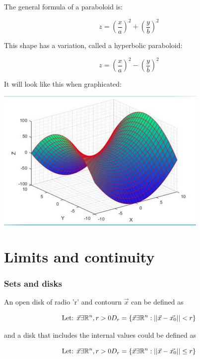 \documentclass[11pt,fleqn]{book} %
\begin{document}
The general formula of a paraboloid is:

\begin{equation}
    z = (\frac{x}{a})^2 + (\frac{y}{b})^2
\end{equation}

This shape has a variation, called a hyperbolic paraboloid:


\begin{equation}
    z = (\frac{x}{a})^2 - (\frac{y}{b})^2
\end{equation}

It will look like this when graphicated:
\begin{center}
    \includegraphics*[]{Pictures/hyperbolic_paraboloid.png}    
\end{center}

\chapter{Limits and continuity}
\subsection*{Sets and disks}
An open disk of radio 'r' and contourn $\vec{x}$ can be defined as


\begin{equation}
    \text{Let: }\vec{x}\exists\mathbb{R}^n , r > 0 \\ D_r = \{ \vec{x} \exists \mathbb{R}^n: ||\vec{x} - \vec{x_0} || < r \}
\end{equation}

and a disk that includes the internal values could be defined as 

\begin{equation}
    \text{Let: }\vec{x}\exists\mathbb{R}^n , r > 0 \\ D_r = \{ \vec{x} \exists \mathbb{R}^n: ||\vec{x} - \vec{x_0} || \le r \}
\end{equation}
\end{document}
